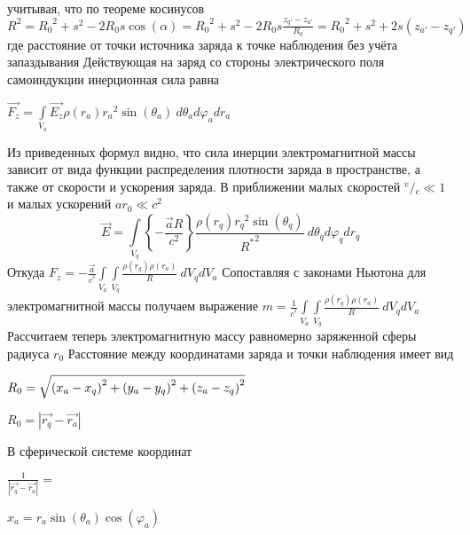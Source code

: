 \documentclass{article}
\begin{document}
учитывая, что по теореме косинусов
${{R}^{2}}={{R}_{0}}^{2}+{{s}^{2}}-2{{R}_{0}}s\cos \left( \alpha  \right)={{R}_{0}}^{2}+{{s}^{2}}-2{{R}_{0}}s\frac{{{z}_{q'}}-{{z}_{a'}}}{{{R}_{0}}}={{R}_{0}}^{2}+{{s}^{2}}+2s\left( {{z}_{a'}}-{{z}_{q'}} \right)$
где  расстояние от точки источника заряда к точке наблюдения без учёта запаздывания
Действующая на заряд со стороны электрического поля самоиндукции инерционная сила равна

$\overrightarrow{{{F}_{z}}}=\int\limits_{{{V}_{a}}}{\overrightarrow{{{E}_{z}}}\rho \left( {{r}_{a}} \right){{r}_{a}}^{2}\sin \left( {{\theta }_{a}} \right)}\ d{{\theta }_{a}}d{{\varphi }_{a}}d{{r}_{a}}$


Из приведенных формул видно, что сила инерции электромагнитной массы зависит от вида функции распределения плотности заряда в пространстве, а также от скорости и ускорения заряда.
В приближении малых скоростей ${}^{v}/{}_{c}\ll 1$  и малых ускорений $a{{r}_{0}}\ll {{c}^{2}}$
\[\overrightarrow{E}=\int\limits_{{{V}_{q}}}{\left\{ -\frac{\overrightarrow{a}R}{{{c}^{2}}} \right\}\frac{\rho \left( {{r}_{q}} \right){{r}_{q}}^{2}\sin \left( {{\theta }_{q}} \right)}{{{R}^{*}}^{2}}\ }d{{\theta }_{q}}d{{\varphi }_{q}}d{{r}_{q}}\]
Откуда
${{F}_{z}}=-\frac{\overrightarrow{a}}{{{c}^{^{2}}}}\int\limits_{{{V}_{a}}}{\int\limits_{{{V}_{q}}}{\frac{\rho \left( {{r}_{q}} \right)\rho \left( {{r}_{a}} \right)}{R}}}\ d{{V}_{q}}d{{V}_{a}}$
Сопоставляя с законами Ньютона для электромагнитной массы получаем выражение
$m=\frac{1}{{{c}^{^{2}}}}\int\limits_{{{V}_{a}}}{\int\limits_{{{V}_{q}}}{\frac{\rho \left( {{r}_{q}} \right)\rho \left( {{r}_{a}} \right)}{R}}}\ d{{V}_{q}}d{{V}_{a}}$
Рассчитаем теперь электромагнитную массу равномерно заряженной сферы радиуса ${{r}_{0}}$
Расстояние между координатами заряда и точки наблюдения имеет вид

${{R}_{0}}=\sqrt{\\
  { { \left( {{x}_{a}}  -  {{x}_{q}}\right) }^{2}} + \\
  { { \left( {{y}_{a}}  -  {{y}_{q}}\right) }^{2}} + \\
  { { \left( {{z}_{a}}  -  {{z}_{q}}\right) }^{2}} }$

${{R}_{0}}=\left|\overrightarrow{r_{q}} - \overrightarrow{r_{a}}\right|$

В сферической системе координат \cite{flugge}

$\frac{1}{\left|\overrightarrow{r_{q}} - \overrightarrow{r_{a}}\right|} = $



${{x}_{a}} = {{r}_{a}}\sin \left( {{\theta }_{a}} \right)\cos \left( {{\varphi }_{a}} \right)$
\end{document}
